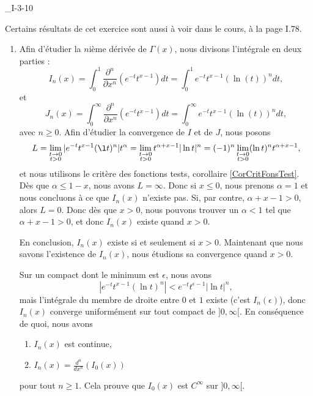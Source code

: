 

\begin{corrige}{_I-3-10}

Certains résultats de cet exercice sont aussi à voir dans le cours, à la page I.78.

\begin{enumerate}
\item 

Afin d'étudier la $n$ième dérivée de $\Gamma(x)$, nous divisons l'intégrale en deux parties :
\begin{equation}
	I_n(x)=\int_0^1\frac{ \partial^n }{ \partial x^n }\left(  e^{-t}t^{x-1} \right)dt=\int_0^1 e^{-t} t^{x-1} (\ln(t))^n dt,
\end{equation}
et 
\begin{equation}
	J_n(x)=\int_0^{\infty}\frac{ \partial^n }{ \partial x^n }\left(  e^{-t}t^{x-1} \right)dt=\int_0^{\infty} e^{-t} t^{x-1} (\ln(t))^n dt,
\end{equation}
avec $n\geq 0$. Afin d'étudier la convergence de $I$ et de $J$, nous posons
\begin{equation}
	L=\lim_{\substack{t\to 0\\t>0}} |  e^{-t}t^{x-1}(\l t)^n |t^{\alpha}= \lim_{\substack{t\to 0\\t>0}} t^{\alpha+x-1}| \ln t |^n=(-1)^n\lim_{\substack{t\to 0\\t>0}} (\ln t)^nt^{\alpha+x-1},
\end{equation}
et nous utilisons le critère des fonctions tests, corollaire \ref{CorCritFonsTest}. Dès que $\alpha\leq 1-x$, nous avons $L=\infty$. Donc si $x\leq0$, nous prenons $\alpha=1$ et nous concluons à ce que $I_n(x)$ n'existe pas. Si, par contre, $\alpha+x-1>0$, alors $L=0$. Donc dès que $x>0$, nous pouvons trouver un $\alpha<1$ tel que $\alpha+x-1>0$, et donc $I_n(x)$ existe quand $x>0$.

En conclusion, $I_n(x)$ existe si et seulement si $x>0$. Maintenant que nous savons l'existence de $I_n(x)$, nous étudions sa convergence quand $x>0$.

Sur un compact dont le minimum est $\epsilon$, nous avons
\begin{equation}
	|  e^{-t}t^{x-1}(\ln t)^n |< e^{-t}t^{\epsilon-1}| \ln t |^n,
\end{equation}
mais l'intégrale du membre de droite entre $0$ et $1$ existe (c'est $I_n(\epsilon)$), donc $I_n(x)$ converge uniformément sur tout compact de $]0,\infty[$. En conséquence de quoi, nous avons
\begin{enumerate}
\item $I_n(x)$ est continue,
\item $I_n(x)=\frac{ d^n }{ dx^n }\left( I_0(x) \right)$
\end{enumerate}
pour tout $n\geq 1$. Cela prouve que $I_0(x)$ est $ C^{\infty}$ sur $]0,\infty[$.


\end{enumerate}
\end{corrige}
